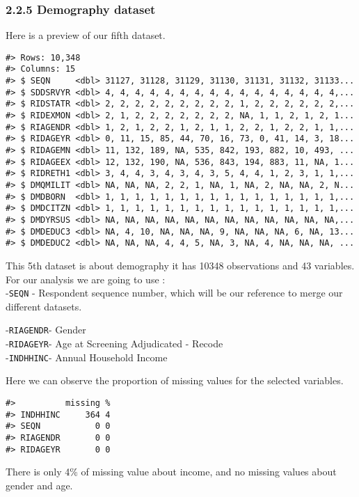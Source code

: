 \documentclass[
]{article}
\begin{document}
\hypertarget{demography-dataset}{%
\subsubsection{2.2.5 Demography dataset}\label{demography-dataset}}

Here is a preview of our fifth dataset.

\begin{verbatim}
#> Rows: 10,348
#> Columns: 15
#> $ SEQN     <dbl> 31127, 31128, 31129, 31130, 31131, 31132, 31133...
#> $ SDDSRVYR <dbl> 4, 4, 4, 4, 4, 4, 4, 4, 4, 4, 4, 4, 4, 4, 4, 4,...
#> $ RIDSTATR <dbl> 2, 2, 2, 2, 2, 2, 2, 2, 2, 1, 2, 2, 2, 2, 2, 2,...
#> $ RIDEXMON <dbl> 2, 1, 2, 2, 2, 2, 2, 2, 2, NA, 1, 1, 2, 1, 2, 1...
#> $ RIAGENDR <dbl> 1, 2, 1, 2, 2, 1, 2, 1, 1, 2, 2, 1, 2, 2, 1, 1,...
#> $ RIDAGEYR <dbl> 0, 11, 15, 85, 44, 70, 16, 73, 0, 41, 14, 3, 18...
#> $ RIDAGEMN <dbl> 11, 132, 189, NA, 535, 842, 193, 882, 10, 493, ...
#> $ RIDAGEEX <dbl> 12, 132, 190, NA, 536, 843, 194, 883, 11, NA, 1...
#> $ RIDRETH1 <dbl> 3, 4, 4, 3, 4, 3, 4, 3, 5, 4, 4, 1, 2, 3, 1, 1,...
#> $ DMQMILIT <dbl> NA, NA, NA, 2, 2, 1, NA, 1, NA, 2, NA, NA, 2, N...
#> $ DMDBORN  <dbl> 1, 1, 1, 1, 1, 1, 1, 1, 1, 1, 1, 1, 1, 1, 1, 1,...
#> $ DMDCITZN <dbl> 1, 1, 1, 1, 1, 1, 1, 1, 1, 1, 1, 1, 1, 1, 1, 1,...
#> $ DMDYRSUS <dbl> NA, NA, NA, NA, NA, NA, NA, NA, NA, NA, NA, NA,...
#> $ DMDEDUC3 <dbl> NA, 4, 10, NA, NA, NA, 9, NA, NA, NA, 6, NA, 13...
#> $ DMDEDUC2 <dbl> NA, NA, NA, 4, 4, 5, NA, 3, NA, 4, NA, NA, NA, ...
\end{verbatim}

This 5th dataset is about demography it has 10348 observations and 43
variables. For our analysis we are going to use :\\
-\texttt{SEQN} - Respondent sequence number, which will be our reference
to merge our different datasets.

-\texttt{RIAGENDR}- Gender\\
-\texttt{RIDAGEYR}- Age at Screening Adjudicated - Recode\\
-\texttt{INDHHINC}- Annual Household Income

Here we can observe the proportion of missing values for the selected
variables.

\begin{verbatim}
#>          missing %
#> INDHHINC     364 4
#> SEQN           0 0
#> RIAGENDR       0 0
#> RIDAGEYR       0 0
\end{verbatim}

There is only 4\% of missing value about income, and no missing values
about gender and age.
\end{document}
